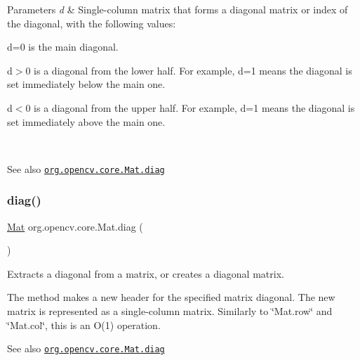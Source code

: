 \begin{DoxyParams}{Parameters}
{\em d} & Single-\/column matrix that forms a diagonal matrix or index of the diagonal, with the following values\+: 
\begin{DoxyItemize}
\item d=0 is the main diagonal. 
\item d$>$0 is a diagonal from the lower half. For example, {\ttfamily d=1} means the diagonal is set immediately below the main one. 
\item d$<$0 is a diagonal from the upper half. For example, {\ttfamily d=1} means the diagonal is set immediately above the main one. 
\end{DoxyItemize}\\
\hline
\end{DoxyParams}
\begin{DoxySeeAlso}{See also}
\href{http://docs.opencv.org/modules/core/doc/basic_structures.html#mat-diag}{\tt org.\+opencv.\+core.\+Mat.\+diag} 
\end{DoxySeeAlso}
\mbox{\label{classorg_1_1opencv_1_1core_1_1_mat_a46c17fd51fa6344e2081006c1a98b4d8}} 
\subsubsection{\texorpdfstring{diag()}{diag()}\hspace{0.1cm}{\footnotesize\ttfamily [2/3]}}
{\footnotesize\ttfamily \mbox{\hyperlink{classorg_1_1opencv_1_1core_1_1_mat}{Mat}} org.\+opencv.\+core.\+Mat.\+diag (\begin{DoxyParamCaption}{ }\end{DoxyParamCaption})}

Extracts a diagonal from a matrix, or creates a diagonal matrix.

The method makes a new header for the specified matrix diagonal. The new matrix is represented as a single-\/column matrix. Similarly to \char`\"{}\+Mat.\+row\char`\"{} and \char`\"{}\+Mat.\+col\char`\"{}, this is an O(1) operation.

\begin{DoxySeeAlso}{See also}
\href{http://docs.opencv.org/modules/core/doc/basic_structures.html#mat-diag}{\tt org.\+opencv.\+core.\+Mat.\+diag} 
\end{DoxySeeAlso}
\mbox{\label{classorg_1_1opencv_1_1core_1_1_mat_a4accc142f642a4f5fc468bea14fc42f1}} 
